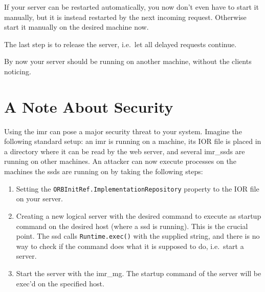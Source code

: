 
If your server can be restarted automatically, you now don't even have
to start it manually, but it is instead restarted by the next incoming
request.  Otherwise start it manually on the desired machine now.

The last step is to release  the server, i.e.~let all delayed requests
continue.


By now your  server should be running on  another machine, without the
clients noticing.

\section{A Note About Security}
Using the imr can pose a major security threat to your system. Imagine
the following standard setup: an imr  is running on a machine, its IOR
file is placed in a directory where  it can be read by the web server,
and several  imr\_ssds are running  on other machines. An  attacker can
now  execute processes  on the  machines the  ssds are  running  on by
taking the following steps:
\begin{enumerate}
         \item  Setting the  {\tt ORBInitRef.ImplementationRepository}
                property to the IOR file on your server.
         \item  Creating a new logical server with the desired command
           to execute as startup command on the desired host (where a
           ssd is running). This is the crucial point. The ssd calls
           {\tt Runtime.exec()} with the supplied string, and there
           is no way to check if the command does what it is supposed
           to do, i.e.~start a server.
         \item Start the server with the imr\_mg. The startup command
           of the server will be exec'd on the specified host.
\end{enumerate}

